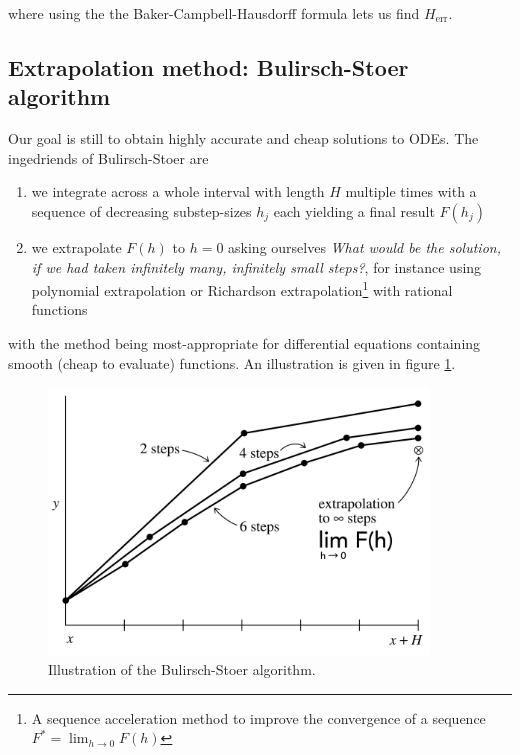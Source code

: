 where using the the Baker-Campbell-Hausdorff formula lets us find $H_{\text {err}}$.

\subsection{Extrapolation method: Bulirsch-Stoer algorithm}
Our goal is still to obtain highly accurate and cheap solutions
to ODEs. The ingedriends of Bulirsch-Stoer are
\begin{enumerate}
  \item we integrate across a whole interval with length $H$ multiple times with a sequence of decreasing substep-sizes $h_j$ each yielding a final result $F(h_j)$
  \item we extrapolate $F(h)$ to $h = 0$ asking ourselves \textit{What would be the solution, if we had taken infinitely many, infinitely small steps?}, for instance using polynomial extrapolation or Richardson extrapolation\footnote{A sequence acceleration method to improve the convergence of a sequence $F^* = \lim_{h\rightarrow 0} F(h)$} with rational functions
\end{enumerate}
with the method being most-appropriate for differential equations containing smooth (cheap to evaluate) functions. An illustration is given in figure \ref{fig:bulirsch_stoer}.

\begin{figure}[!htb]
  \centering
  \includegraphics[width=0.9\textwidth]{figures/bulirsch.pdf}\hfill
  \caption{Illustration of the Bulirsch-Stoer algorithm.}
  \label{fig:bulirsch_stoer}
\end{figure}


